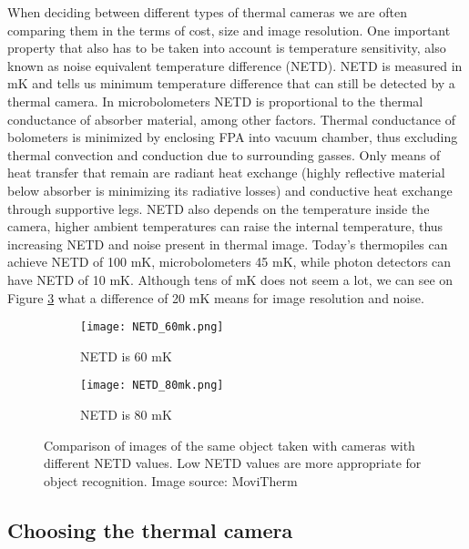 When deciding between different types of thermal cameras we are often comparing them in the terms of cost, size and image resolution.
One important property that also has to be taken into account is temperature sensitivity, also known as noise equivalent temperature difference (NETD).
NETD is measured in \si{\milli\kelvin} and tells us minimum temperature difference that can still be detected by a thermal camera.
In microbolometers NETD is proportional to the thermal conductance of absorber material, among other factors\cite{thermal_book}.
Thermal conductance of bolometers is minimized by enclosing FPA into vacuum chamber, thus excluding thermal convection and conduction due to surrounding gasses.
Only means of heat transfer that remain are radiant heat exchange (highly reflective material below absorber is minimizing its radiative losses) and conductive heat exchange through supportive legs.
NETD also depends on the temperature inside the camera, higher ambient temperatures can raise the internal temperature, thus increasing NETD and noise present in thermal image.
Today's thermopiles can achieve NETD of 100 \si{\milli\kelvin}, microbolometers 45 \si{\milli\kelvin}, while photon detectors can have NETD of 10 \si{\milli\kelvin}.
Although tens of \si{\milli\kelvin} does not seem a lot, we can see on Figure \ref{NETD} what a difference of 20 \si{\milli\kelvin} means for image resolution and noise.
\newline

\begin{figure}[ht]
    \begin{subfigure}{0.5\textwidth}
        \centering
        \texttt{[image: NETD\_60mk.png]} 
        \caption{NETD is 60 \si{\milli\kelvin}}
        \label{NETD_60mk}
    \end{subfigure}
    \begin{subfigure}{0.5\textwidth}
        \centering
        \texttt{[image: NETD\_80mk.png]}
        \caption{NETD is 80 \si{\milli\kelvin}}
        \label{NETD_80mk}
    \end{subfigure}

    \caption{Comparison of images of the same object taken with cameras with different NETD values. Low NETD values are more appropriate for object recognition. Image source: MoviTherm \cite{NETD}}
    \label{NETD}
\end{figure}


\subsection{ Choosing the thermal camera}

